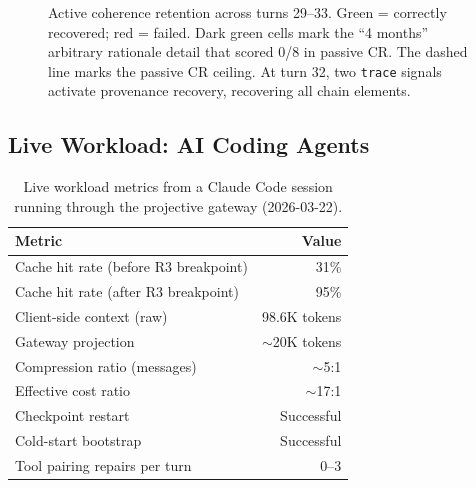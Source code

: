 \documentclass[sigplan,screen,anonymous]{acmart}
\begin{document}
\begin{figure}[t]
\caption{Active coherence retention across turns 29--33.
  Green = correctly recovered; red = failed.
  Dark green cells mark the ``4 months'' arbitrary rationale
  detail that scored 0/8 in passive CR.
  The dashed line marks the passive CR ceiling.
  At turn 32, two \texttt{trace} signals activate provenance
  recovery, recovering all chain elements.}
\label{fig:cr-heatmap}
\end{figure}

\subsection{Live Workload: AI Coding Agents}
\label{sec:live}

\begin{table}[t]
\centering
\caption{Live workload metrics from a Claude Code session running
  through the projective gateway (2026-03-22).}
\label{tab:live}
\begin{tabular}{lr}
\toprule
Metric & Value \\
\midrule
Cache hit rate (before R3 breakpoint) & 31\% \\
Cache hit rate (after R3 breakpoint) & 95\% \\
Client-side context (raw) & 98.6K tokens \\
Gateway projection & $\sim$20K tokens \\
Compression ratio (messages) & $\sim$5:1 \\
Effective cost ratio & $\sim$17:1 \\
Checkpoint restart & Successful \\
Cold-start bootstrap & Successful \\
Tool pairing repairs per turn & 0--3 \\
\bottomrule
\end{tabular}
\end{table}
\end{document}
